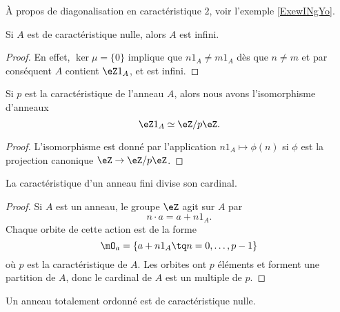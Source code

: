 À propos de diagonalisation en caractéristique \( 2\), voir l'exemple \ref{ExewINgYo}.

\begin{lemma}
    Si \( A\) est de caractéristique nulle, alors \( A\) est infini.
\end{lemma}

\begin{proof}
    En effet, \( \ker\mu=\{0\} \) implique que \( n1_A \neq  m1_A\) dès que \(n \neq m \) et par conséquent \( A\) contient \(\eZ 1_A \), et  est infini.
\end{proof}

\begin{lemma}       \label{LemHmDaYH}
    Si \( p\) est la caractéristique de l'anneau \( A\), alors nous avons l'isomorphisme d'anneaux
    \begin{equation}
         \eZ 1_A\simeq\eZ/p\eZ.
    \end{equation}
\end{lemma}

\begin{proof}
    L'isomorphisme est donné par l'application \( n1_A\mapsto \phi(n)\) si \( \phi\) est la projection canonique \( \eZ\to \eZ/p\eZ\).
\end{proof}

\begin{proposition}     \label{PropGExaUK}
    La caractéristique d'un anneau fini divise son cardinal.
\end{proposition}

\begin{proof}
    Si \( A\) est un anneau, le groupe \( \eZ\) agit sur \( A\) par
    \begin{equation}
        n\cdot a=a+n1_A.
    \end{equation}
    Chaque orbite de cette action est de la forme
    \begin{equation}
        \mO_a=\{ a+n1_A\tq n=0,\ldots, p-1 \}
    \end{equation}
    où \( p\) est la caractéristique de \( A\). Les orbites ont \( p\) éléments et forment une partition de \( A\), donc le cardinal de \( A\) est un multiple de \( p\).
\end{proof}

\begin{lemma}        \label{LEMooJQIKooQgukqn}
    Un anneau totalement ordonné est de caractéristique nulle.
\end{lemma}

